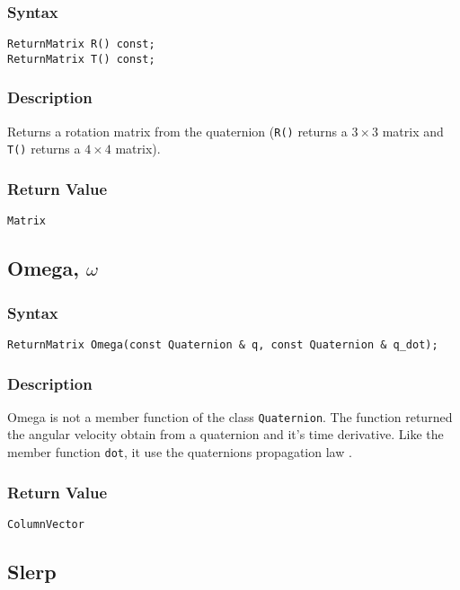 \documentclass[11pt,fleqn,letterpaper]{report}
\begin{document}
\subsubsection*{Syntax}
\begin{verbatim}
ReturnMatrix R() const;
ReturnMatrix T() const;
\end{verbatim}
\subsubsection{Description}
Returns a rotation matrix from the quaternion (\texttt{R()} returns a
$3 \times 3$ matrix and \texttt{T()} returns a $4 \times 4$ matrix).

\subsubsection*{Return Value}

{\tt Matrix}

\newpage

\subsection*{Omega, $\omega$}

\subsubsection*{Syntax}
\begin{verbatim}
ReturnMatrix Omega(const Quaternion & q, const Quaternion & q_dot);
\end{verbatim}
\subsubsection{Description}
Omega is not a member function of the class \texttt{Quaternion}. The
function returned the angular velocity obtain from a quaternion and
it's time derivative. Like the member function \texttt{dot}, it use
the quaternions propagation law \cite{Dam98}.

\subsubsection*{Return Value}

{\tt ColumnVector}

\newpage

\subsection*{Slerp}
\end{document}
